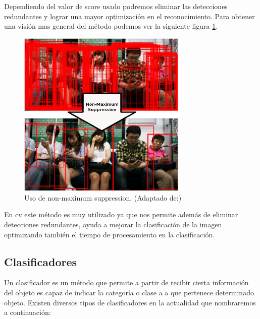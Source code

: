 Dependiendo del valor de score usado podremos eliminar las detecciones redundantes y lograr una mayor optimización  en el reconocimiento. Para obtener una visión mas general del método podemos ver la siguiente figura \ref{Fig: nonmaximumsuppression}.

\begin{figure}[H]
 \centering
  \includegraphics[height=8cm,keepaspectratio=true,clip=true]{imagenes/Logos/nms.png}
  \caption{Uso de non-maximum suppression. (Adaptado de:\citep{nms2})}
	\label{Fig: nonmaximumsuppression}
\end{figure}

En \ac{cv} este método es muy utilizado ya que nos permite además de eliminar detecciones redundantes, ayuda a mejorar la clasificación de la imagen optimizando también el tiempo de procesamiento en la clasificación.


\subsection{Clasificadores}\label{sub:clasificadores}

Un clasificador es un método que permite a partir de recibir cierta información del objeto es capaz de indicar la categoría o clase a a que pertenece determinado objeto. Existen diversos tipos de clasificadores en la actualidad que nombraremos a continuación:

